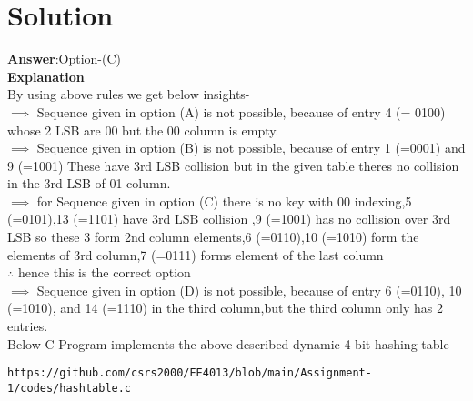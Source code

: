 \documentclass[journal,12pt,twocolumn]{IEEEtran}
\begin{document}
\section{Solution}
\textbf{Answer}:Option-(C)
\\
\textbf{Explanation}\\
By using above rules we get below insights-\\
$\implies$ Sequence given in option (A) is not possible, because of entry 4 (= 0100) whose 2 LSB are 00 but the 00 column is empty.\\
$\implies$ Sequence given in option (B) is not possible, because of entry 1 (=0001) and 9 (=1001) These have 3rd LSB collision but in the given table theres no collision in the 3rd LSB of 01 column.\\
$\implies$ for Sequence given in option (C) there is no key with 00 indexing,5 (=0101),13 (=1101) have 3rd LSB collision ,9 (=1001) has no collision over 3rd LSB so these 3 form 2nd column elements,6 (=0110),10 (=1010) form the elements of 3rd column,7 (=0111) forms element of the last column\\ $\therefore$ hence this is the correct option\\
$\implies$ Sequence given in option (D) is not possible, because of entry 6 (=0110), 10 (=1010), and 14 (=1110) in the third column,but the third column only has 2 entries.\\
Below C-Program implements the above described dynamic 4 bit hashing table
\begin{lstlisting}
https://github.com/csrs2000/EE4013/blob/main/Assignment-1/codes/hashtable.c
\end{lstlisting}
\end{document}
